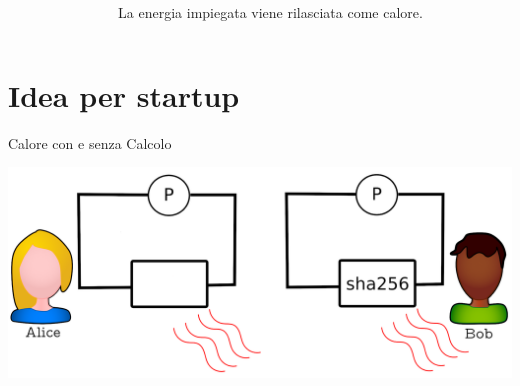 \documentclass{beamer}
\begin{document}
\begin{frame}{\insertsection}
\begin{columns}
\begin{column}{.5\textwidth}
    \end{column}
    \begin{column}{.5\textwidth}
       \begin{block}{}
       La energia impiegata viene rilasciata come calore.
       \end{block}
    \end{column}
\end{columns}
\end{frame}

\section{Idea per startup}
\begin{frame}{Calore con e senza Calcolo}
    \centering


    \includegraphics[height=.5\textheight]{images/alice-bob.png}
\end{frame}
\end{document}
